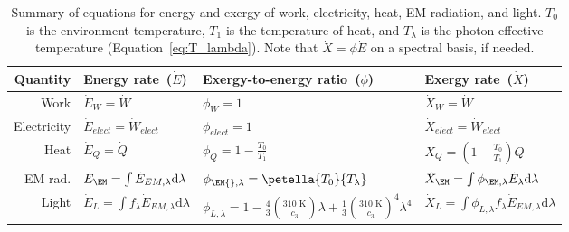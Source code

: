 

\begin{table}
\centering %
\caption{Summary of equations for energy and exergy of work, electricity, heat, EM radiation, and light.
         $T_0$ is the environment temperature, $T_1$ is the temperature of heat, 
         and $T_\lambda$ is the photon effective temperature
         (Equation~\ref{eq:T_lambda}).
         Note that $\dot{X} = \phi \dot{E}$ 
         on a spectral basis, if needed.}
\begin{tabular}{r l l l}
  \toprule
  Quantity 
      & Energy rate~($\dot{E}$) 
      & Exergy-to-energy ratio~($\phi$) 
      & Exergy rate~($\dot{X}$) \\
  \midrule
  Work        
      & $\dot{E}_W = \dot{W}$
      & $\phi_W = 1$
      & $\dot{X}_W = \dot{W}$ \\
  Electricity 
      & $\dot{E}_{elect} = \dot{W}_{elect}$
      & $\phi_{elect} = 1$
      & $\dot{X}_{elect} = \dot{W}_{elect}$ \\
  Heat 
      & $\dot{E}_Q = \dot{Q}$   
      & $\phi_Q = 1 - \frac{T_0}{T_1}$  
      & $ \dot{X}_Q = \left( 1 - \frac{T_0}{T_1} \right) \dot{Q}  $ \\
  EM rad.
      & $\dot{E}_{\EM} = \int \dot{E}_{EM,\lambda} \mathrm{d}\lambda$ 
      & $\phi_{\EM{},\lambda} = \petella{T_0}{T_\lambda}$ 
      & $\dot{X}_{\EM} = \int \phi_{\EM,\lambda} \dot{E}_\lambda \mathrm{d}\lambda$ \\
  Light
      & $\dot{E}_L = \int f_\lambda \dot{E}_{EM,\lambda} \mathrm{d}\lambda$
      & $\phi_{L,\lambda} = 1 
                            - \frac{4}{3} \left( \frac{310 \text{ K}}{c_3} \right) \lambda 
                            + \frac{1}{3} \left( \frac{310 \text{ K}}{c_3} \right)^4 \lambda^4$ %
      & $\dot{X}_L = \int \phi_{L,\lambda} f_\lambda \dot{E}_{EM,\lambda} \mathrm{d}\lambda$ \\
  \bottomrule
\end{tabular}
\label{tab:EX_summary}
\end{table}


